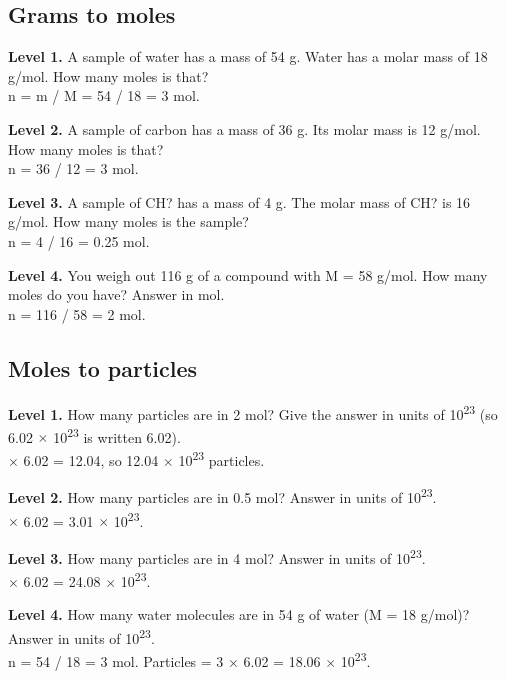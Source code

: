 \documentclass[11pt]{article}
\begin{document}
\subsection*{Grams to moles}
\noindent\textbf{Level 1.} A sample of water has a mass of 54 g. Water has a molar mass of 18 g/mol. How many moles is that?\\  \quad n = m / M = 54 / 18 = 3 mol.\par\medskip
\noindent\textbf{Level 2.} A sample of carbon has a mass of 36 g. Its molar mass is 12 g/mol. How many moles is that?\\  \quad n = 36 / 12 = 3 mol.\par\medskip
\noindent\textbf{Level 3.} A sample of CH? has a mass of 4 g. The molar mass of CH? is 16 g/mol. How many moles is the sample?\\  \quad n = 4 / 16 = 0.25 mol.\par\medskip
\noindent\textbf{Level 4.} You weigh out 116 g of a compound with M = 58 g/mol. How many moles do you have? Answer in mol.\\  \quad n = 116 / 58 = 2 mol.\par\medskip
\subsection*{Moles to particles}
\noindent\textbf{Level 1.} How many particles are in 2 mol? Give the answer in units of 10\textsuperscript{2}\textsuperscript{3} (so 6.02 $\times$ 10\textsuperscript{2}\textsuperscript{3} is written 6.02).\\   $\times$ 6.02 = 12.04, so 12.04 $\times$ 10\textsuperscript{2}\textsuperscript{3} particles.\par\medskip
\noindent\textbf{Level 2.} How many particles are in 0.5 mol? Answer in units of 10\textsuperscript{2}\textsuperscript{3}.\\   $\times$ 6.02 = 3.01 $\times$ 10\textsuperscript{2}\textsuperscript{3}.\par\medskip
\noindent\textbf{Level 3.} How many particles are in 4 mol? Answer in units of 10\textsuperscript{2}\textsuperscript{3}.\\   $\times$ 6.02 = 24.08 $\times$ 10\textsuperscript{2}\textsuperscript{3}.\par\medskip
\noindent\textbf{Level 4.} How many water molecules are in 54 g of water (M = 18 g/mol)? Answer in units of 10\textsuperscript{2}\textsuperscript{3}.\\  \quad n = 54 / 18 = 3 mol. Particles = 3 $\times$ 6.02 = 18.06 $\times$ 10\textsuperscript{2}\textsuperscript{3}.\par\medskip
\end{document}
